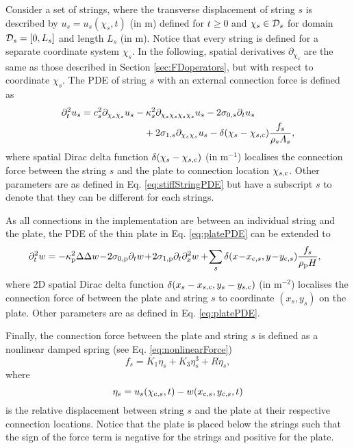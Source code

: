 Consider a set of strings, where the transverse displacement of string $s$ is described by $u_s = u_s(\chi_s, t)$ (in m) defined for $t\geq 0$ and $\chi_s \in \mathcal{D}_s$ for domain $\mathcal{D}_s = [0, L_s]$ and length $L_s$ (in m). Notice that every string is defined for a separate coordinate system $\chi_s$. In the following, spatial derivatives $\partial_{\chi_s}$ are the same as those described in Section \ref{sec:FDoperators}, but with respect to coordinate $\chi_s$. The PDE of string $s$ with an external connection force is defined as %
\begin{equation}
    \begin{aligned}
    \ptt u_s = c_s^2 \partial_{\chi_s\chi_s} u_s &- \kappa_s^2 \partial_{\chi_s\chi_s\chi_s\chi_s} u_s - 2 \szX[s]\pt u_s\\
    &\quad + 2 \soX[s] \partial_{\chi_s\chi_s} u_s - \delta(\chi_s - \chi_{s, \ctxt})\frac{f_s}{\rho_sA_s},
    \end{aligned}
\end{equation}
where spatial Dirac delta function $\delta(\chi_s - \chi_{s,\text{c}})$ (in m$^{-1}$) localises the connection force between the string $s$ and the plate to connection location $\chi_{s, \text{c}}$. Other parameters are as defined in Eq. \eqref{eq:stiffStringPDE} but have a subscript $s$ to denote that they can be different for each strings. 

As all connections in the implementation are between an individual string and the plate, the PDE of the thin plate in Eq. \eqref{eq:platePDE} can be extended to 
\begin{equation}
    \begin{aligned}
    \!\!\!\!\ptt w = -\kappa_\ptxt^2\Delta\Delta w &\!-\! 2\szX[\ptxt]\pt w\! +\! 2\soX[\ptxt] \pt\pxx w+ \!\sum_s\delta(x \!-\! x_{\ctxt,s}, y \!-\! y_{\ctxt,s})\frac{f_s}{\rho_\ptxt H},\!\!\!\!\!\!
    \end{aligned}
\end{equation}
where 2D spatial Dirac delta function $\delta(x_s - x_{s,\text{c}}, y_s - y_{s,\text{c}})$ (in m$^{-2}$) localises the connection force of between the plate and string $s$ to coordinate $(x_s, y_s)$ on the plate. Other parameters are as defined in Eq. \eqref{eq:platePDE}. 

Finally, the connection force between the plate and string $s$ is defined as a nonlinear damped spring (see Eq. \eqref{eq:nonlinearForce})
\begin{equation}
    f_s = K_1\eta_s + K_3\eta_s^3 + R \dot \eta_s,
\end{equation}
where
\begin{equation}
    \eta_s = u_s(\chi_{\text{c},s}, t) - w(x_{\text{c},s}, y_{\text{c},s}, t)
\end{equation}
is the relative displacement between string $s$ and the plate at their respective connection locations. Notice that the plate is placed below the strings such that the sign of the force term is negative for the strings and positive for the plate.

